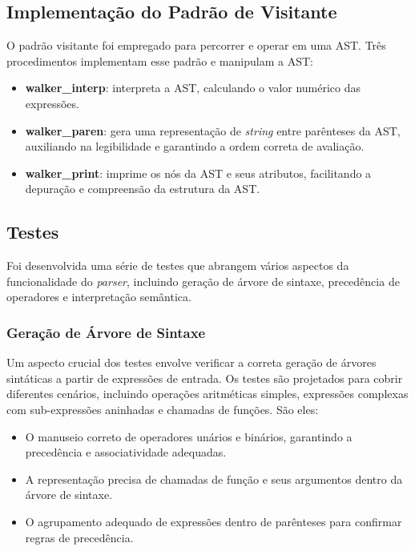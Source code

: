 \documentclass[english, 
               brazil, 
               bsc] %
               {dcomp-abntex2}
\begin{document}
\subsection{Implementação do Padrão de Visitante}


O padrão visitante foi empregado para percorrer e operar em uma AST. Três procedimentos implementam esse padrão e manipulam a AST:


\begin{itemize}
  \item \textbf{walker\_interp}: interpreta a AST, calculando o valor numérico das expressões.
  \item \textbf{walker\_paren}: gera uma representação de \textit{string} entre parênteses da AST, auxiliando na legibilidade e garantindo a ordem correta de avaliação.
  \item \textbf{walker\_print}: imprime os nós da AST e seus atributos, facilitando a depuração e compreensão da estrutura da AST.
\end{itemize}


\subsection{Testes}


Foi desenvolvida uma série de testes que  abrangem vários aspectos da funcionalidade do \textit{parser}, incluindo geração de árvore de sintaxe, precedência de operadores e interpretação semântica.


\subsubsection{Geração de Árvore de Sintaxe}


Um aspecto crucial dos testes envolve verificar a correta geração de árvores sintáticas a partir de expressões de entrada. Os testes são projetados para cobrir diferentes cenários, incluindo operações aritméticas simples, expressões complexas com sub-expressões aninhadas e chamadas de funções. São eles:


\begin{itemize}
    \item O manuseio correto de operadores unários e binários, garantindo a precedência e associatividade adequadas.
    \item A representação precisa de chamadas de função e seus argumentos dentro da árvore de sintaxe.
    \item O agrupamento adequado de expressões dentro de parênteses para confirmar regras de precedência.
\end{itemize}
\end{document}
